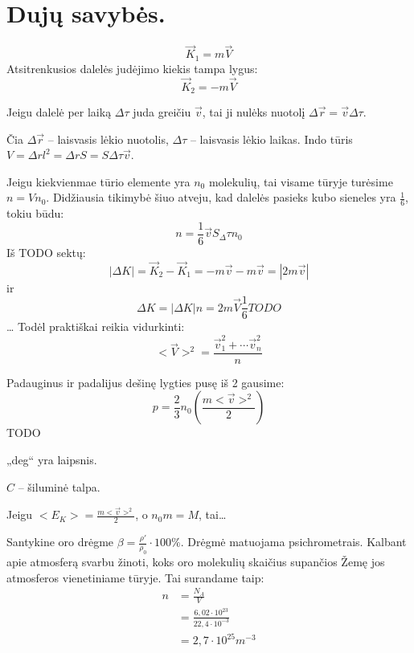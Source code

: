 \section{Dujų savybės.}

\begin{equation*}
  \vec{K}_{1} = m \vec{V}
\end{equation*}
Atsitrenkusios dalelės judėjimo kiekis tampa lygus:
\begin{equation*}
  \vec{K}_{2} = -m \vec{V}
\end{equation*}

Jeigu dalelė per laiką $\Delta \tau$ juda greičiu $\vec{v}$, tai ji
nulėks nuotolį $\Delta \vec{r} = \vec{v} \Delta \tau$.

Čia $\Delta \vec{r}$ – laisvasis lėkio nuotolis, $\Delta \tau$ – laisvasis
lėkio laikas.
Indo tūris $V= \Delta r l^{2} = \Delta r S = S \Delta \tau \vec{v}$.

Jeigu kiekvienmae tūrio elemente yra $n_{0}$ molekulių, tai visame tūryje
turėsime $n = Vn_{0}$. Didžiausia tikimybė šiuo atveju, kad dalelės pasieks
kubo sieneles yra $\frac{1}{6}$, tokiu būdu:
\begin{equation}
  n = \frac{1}{6} \vec{v}S_{\Delta}\tau n_{0}
  \label{eq:dujos}
\end{equation}
Iš TODO sektų:
\begin{equation*}
  |\Delta K | = \vec{K}_{2} - \vec{K}_{1} = - m \vec{v} - m \vec{v} =
  |2m\vec{v}|
\end{equation*}
ir 
\begin{equation*}
  \Delta K = |\Delta K| n = 2m \vec{V} \frac{1}{6} TODO
\end{equation*}
…
Todėl praktiškai reikia vidurkinti:
\begin{equation*}
  <\vec{V}>^{2} = \frac{\vec{v}_{1}^{2} + \cdots \vec{v}^{2}_{n}}{n}
\end{equation*}

Padauginus ir padalijus dešinę lygties pusę iš 2 gausime:
\begin{equation*}
  p = \frac{2}{3} n_{0} \left( \frac{m <\vec{v}>^{2}}{2} \right)
\end{equation*}
TODO

„deg“ yra laipsnis.

$C$ – šiluminė talpa.

Jeigu $<E_{K}> = \frac{m <\vec{v}>^{2}}{2}$, o $n_{0}m = M$, tai…

Santykine oro drėgme $\beta = \frac{\rho'}{\rho_{0}} \cdot 100 \%$.
Drėgmė matuojama psichrometrais. Kalbant apie atmosferą svarbu
žinoti, koks oro molekulių skaičius supančios Žemę jos atmosferos
vienetiniame tūryje. Tai surandame taip:
\begin{align*}
  n
  &= \frac{N_{A}}{V} \\
  &= \frac{6,02 \cdot 10^{23}}{22,4 \cdot 10 ^{-3}} \\
  &= 2,7 \cdot 10 ^{25} m^{-3} \\
\end{align*}

